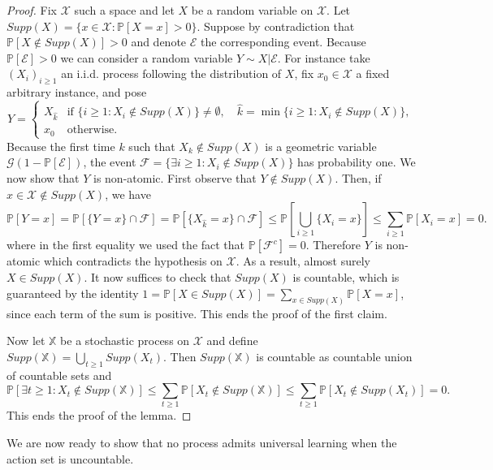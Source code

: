 \documentclass[aos]{imsart}
\theoremstyle{plain}
\theoremstyle{remark}
\newcommand{\Ecal}{\mathcal{E}}
\newcommand{\Fcal}{\mathcal{F}}
\newcommand{\Gcal}{\mathcal{G}}
\newcommand{\Xcal}{\mathcal{X}}
\newcommand{\Pbb}{\mathbb{P}}
\newcommand{\Xbb}{\mathbb{X}}
\newcommand{\1}{\mathbbm{1}}%
\begin{document}
\begin{proof}
Fix $\Xcal$ such a space and let $X$ be a random variable on $\Xcal$. Let $Supp(X) = \{x\in\Xcal: \Pbb[X=x]>0\}$. Suppose by contradiction that $\Pbb[X\notin Supp(X)]>0$ and denote $\Ecal$ the corresponding event. Because $\Pbb[\Ecal]>0$ we can consider a random variable $Y\sim X|\Ecal$. For instance take $(X_i)_{i\geq 1}$ an i.i.d. process following the distribution of $X$, fix $x_0\in\Xcal$ a fixed arbitrary instance, and pose
\begin{equation*}
    Y = \begin{cases}
        X_{\hat k} & \text{if } \{i \geq 1: X_i\notin Supp(X)\}\neq \emptyset, \quad \hat k = \min \{i \geq 1: X_i\notin Supp(X)\},\\
        x_0 &\text{otherwise.}
    \end{cases}
\end{equation*}
Because the first time $k$ such that $X_k\notin Supp(X)$ is a geometric variable $\Gcal(1-\Pbb[\Ecal])$, the event $\Fcal = \{\exists i \geq 1: X_i\notin Supp(X)\}$ has probability one. We now show that $Y$ is non-atomic. First observe that $Y\notin Supp(X)$. Then, if $x\in \Xcal\notin Supp(X)$, we have
\begin{equation*}
    \Pbb[Y = x] = \Pbb[\{Y = x\}\cap\Fcal] = \Pbb[\{X_{\hat k} = x\}\cap\Fcal] \leq \Pbb\left[\bigcup_{i\geq 1}\{X_i=x\}\right] \leq \sum_{i\geq 1}\Pbb[X_i=x] = 0.
\end{equation*}
where in the first equality we used the fact that $\Pbb[\Fcal^c] = 0$. Therefore $Y$ is non-atomic which contradicts the hypothesis on $\Xcal$. As a result, almost surely $X\in Supp(X)$. It now suffices to check that $Supp(X)$ is countable, which is guaranteed by the identity $1 = \Pbb[X\in Supp(X)] =\sum_{x\in Supp(X)} \Pbb[X=x]$, since each term of the sum is positive. This ends the proof of the first claim.

Now let $\Xbb$ be a stochastic process on $\Xcal$ and define $Supp(\Xbb) = \bigcup_{t\geq 1} Supp(X_t)$. Then $Supp(\Xbb)$ is countable as countable union of countable sets and
\begin{equation*}
    \Pbb[\exists t\geq 1: X_t\notin Supp(\Xbb)] \leq \sum_{t\geq 1} \Pbb[X_t\notin Supp(\Xbb)] \leq \sum_{t\geq 1} \Pbb[X_t\notin Supp(X_t)] = 0.
\end{equation*}
This ends the proof of the lemma.
\end{proof}


We are now ready to show that no process admits universal learning when the action set is uncountable.
\end{document}
